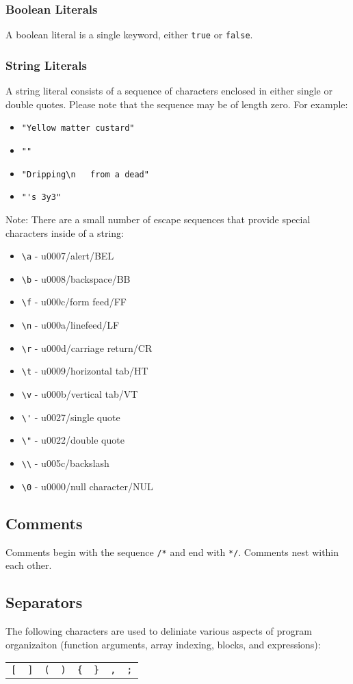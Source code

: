 \subsubsection{Boolean Literals}
A boolean literal is a single keyword, either \verb!true! or \verb!false!.

\subsubsection{String Literals}
A string literal consists of a sequence of characters enclosed in either single or double quotes. Please note that the sequence may be of length zero. For example:
\begin{itemize}
\item \verb!"Yellow matter custard"!
\item \verb!""!
\item \verb!"Dripping\n   from a dead"!
\item \verb!"'s 3y3"!
\end{itemize}

Note: There are a small number of escape sequences that provide special characters inside of a string:
\begin{itemize}
\item \verb!\a! - u0007/alert/BEL
\item \verb!\b! - u0008/backspace/BB
\item \verb!\f! - u000c/form feed/FF
\item \verb!\n! - u000a/linefeed/LF
\item \verb!\r! - u000d/carriage return/CR
\item \verb!\t! - u0009/horizontal tab/HT
\item \verb!\v! - u000b/vertical tab/VT
\item \verb!\'! - u0027/single quote
\item \verb!\"! - u0022/double quote
\item \verb!\\! - u005c/backslash
\item \verb!\0! - u0000/null character/NUL 
\end{itemize}

\subsection{Comments}
Comments begin with the sequence \verb!/*! and end with \verb!*/!. Comments nest within each other.

\subsection{Separators}
The following characters are used to deliniate various aspects of program organizaiton (function arguments, array indexing, blocks, and expressions):
\begin{center}
\begin{tabular}{cccccccc}
\verb![! & \verb|]| & \verb!(! & \verb!)! & \verb!{! & \verb!}! & \verb!,! & \verb!;!\\
\end{tabular}
\end{center}

